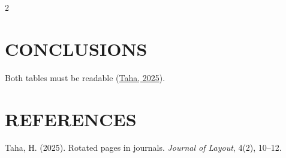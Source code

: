 \documentclass[9pt]{extarticle}
\begin{document}
\begin{multicols}{2}
\section{CONCLUSIONS}
Both tables must be readable (\hyperlink{ref:1}{Taha, 2025}).

\section*{REFERENCES}
\begin{list}{}{
    \setlength{\leftmargin}{1.5em}
    \setlength{\itemindent}{-1.5em}
    \setlength{\parsep}{0pt}
    \setlength{\itemsep}{6pt}
}
\item \hypertarget{ref:1}{}Taha, H. (2025). Rotated pages in journals. \textit{Journal of Layout}, 4(2), 10–12.

\end{list}
\end{multicols}
\end{document}
